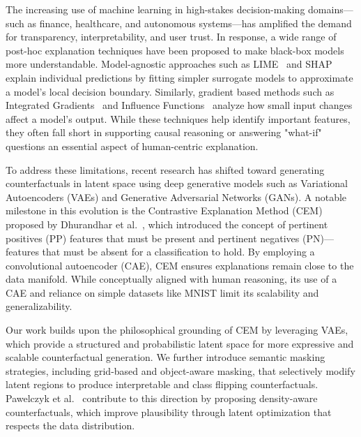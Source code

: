 The increasing use of machine learning in high-stakes decision-making domains—such as finance, healthcare, and autonomous systems—has amplified the demand for transparency, interpretability, and user trust. In response, a wide range of post-hoc explanation techniques have been proposed to make black-box models more understandable. Model-agnostic approaches such as LIME~\cite{Ribeiro2018} and SHAP~\cite{lundberg2017unifiedapproachinterpretingmodel} explain individual predictions by fitting simpler surrogate models to approximate a model’s local decision boundary. Similarly, gradient based methods such as Integrated Gradients~\cite{8237336} and Influence Functions~\cite{pmlr-v70-koh17a} analyze how small input changes affect a model’s output. While these techniques help identify important features, they often fall short in supporting causal reasoning or answering "what-if" questions an essential aspect of human-centric explanation.


To address these limitations, recent research has shifted toward generating counterfactuals in latent space using deep generative models such as Variational Autoencoders (VAEs) and Generative Adversarial Networks (GANs). A notable milestone in this evolution is the Contrastive Explanation Method (CEM) proposed by Dhurandhar et al.~\cite{DBLP:journals/corr/abs-1802-07623}, which introduced the concept of pertinent positives (PP) features that must be present and pertinent negatives (PN)—features that must be absent for a classification to hold. By employing a convolutional autoencoder (CAE), CEM ensures explanations remain close to the data manifold. While conceptually aligned with human reasoning, its use of a CAE and reliance on simple datasets like MNIST limit its scalability and generalizability.

Our work builds upon the philosophical grounding of CEM by leveraging VAEs, which provide a structured and probabilistic latent space for more expressive and scalable counterfactual generation. We further introduce semantic masking strategies, including grid-based and object-aware masking, that selectively modify latent regions to produce interpretable and class flipping counterfactuals. Pawelczyk et al.~\cite{Pawelczyk_2020} contribute to this direction by proposing density-aware counterfactuals, which improve plausibility through latent optimization that respects the data distribution.

